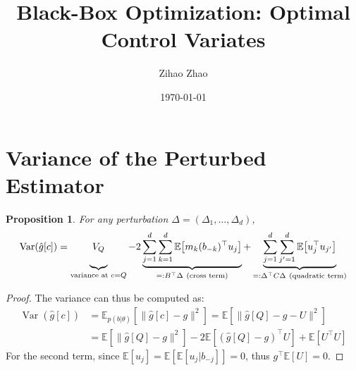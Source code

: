 \documentclass{article}
\theoremstyle{plain}
\newtheorem{proposition}[theorem]{Proposition}
\theoremstyle{definition}
\newcommand{\E}{\mathbb{E}}
\DeclareMathOperator{\Var}{Var}
\begin{document}
\title{Black-Box Optimization: Optimal Control Variates}
\author{Zihao Zhao}
\date{\today}
\maketitle

\section{Variance of the Perturbed Estimator}

\begin{proposition}
    For any perturbation $\Delta = (\Delta_1, \dots, \Delta_d)$,
    \begin{align}
        \Var(\hat{g}[c]) = \underbrace{\vphantom{\sum_{j,k}}V_{Q}}_{\text{variance at }c=Q} - 2\underbrace{\sum_{j=1}^d\sum_{k=1}^d
     \mathbb{E}\big[m_k(b_{-k})^{\top}u_j\big]}_{=:B^{\top}\Delta\ (\text{cross term})} + \underbrace{\sum_{j=1}^d\sum_{j'=1}^d
     \mathbb{E}\big[u_j^{\top}u_{j'}\big]}_{=:\Delta^{\top}C\Delta\ (\text{quadratic term})}
    \end{align}
\end{proposition}

\begin{proof}
    The variance can thus be computed as:
    \begin{align}
        \Var(\hat{g}[c]) &= \E_{p(b|\theta)} [\|\hat{g}[c] - g\|^2] = \E[\|\hat{g}[Q] - g - U\|^2]\\
        &=\E[\|\hat{g}[Q] - g\|^2] - 2\E[(\hat{g}[Q] - g)^\top U] + \E[U^\top U]
    \end{align}
    For the second term, since $\E[u_j] = \E[\E[u_j | b_{-j}]] = 0$, thus $g^\top \E[U]=0$. 
\end{proof}
\end{document}
